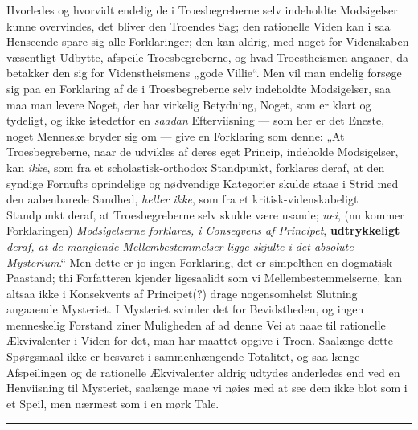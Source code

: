 \documentclass[12pt,a4paper]{book}
\newcommand{\opage}[1]{\marginnote{\footnotesize\textit{[#1]}}}
\begin{document}
Hvorledes og hvorvidt endelig de i Troesbegreberne
\opage{88}\setcounter{footnote}{0}%
selv indeholdte Modsigelser kunne overvindes, det bliver
den Troendes Sag; den rationelle Viden kan i saa
Henseende spare sig alle Forklaringer; den kan aldrig,
med noget for Videnskaben væsentligt Udbytte, afspeile
Troesbegreberne, og hvad Troestheismen angaaer, da
betakker den sig for Videnstheismens „gode Villie“. Men
vil man endelig forsøge sig paa en Forklaring af de i Troesbegreberne
selv indeholdte Modsigelser, saa maa man
levere Noget, der har virkelig Betydning, Noget, som
er klart og tydeligt, og ikke istedetfor en \emph{saadan} Efterviisning
--- som her er det Eneste, noget Menneske
bryder sig om --- give en Forklaring som denne:
„At Troesbegreberne, naar de udvikles af deres eget
Princip, indeholde Modsigelser, kan \emph{ikke}, som fra et
scholastisk-orthodox Standpunkt, forklares deraf, at den
syndige Fornufts oprindelige og nødvendige Kategorier
skulde staae i Strid med den aabenbarede Sandhed,
\emph{heller ikke}, som fra et kritisk-videnskabeligt Standpunkt
deraf, at Troesbegreberne selv skulde være usande; \emph{nei},
(nu kommer Forklaringen) \emph{Modsigelserne forklares,
i Conseqvens af Principet}, \textbf{udtrykkeligt} \emph{deraf,
at de manglende Mellembestemmelser ligge
skjulte i det absolute Mysterium}.“ Men dette
er jo ingen Forklaring, det er simpelthen en dogmatisk
Paastand; thi Forfatteren kjender ligesaalidt som vi
Mellembestemmelserne, kan altsaa ikke i Konsekvents af
Principet(?) drage nogensomhelst Slutning angaaende
Mysteriet. I Mysteriet svimler det for Bevidstheden,
og ingen menneskelig Forstand øiner Muligheden af ad
denne Vei at naae til rationelle Ækvivalenter i Viden
\opage{89}\setcounter{footnote}{0}%
for det, man har maattet opgive i Troen. Saalænge
dette Spørgsmaal ikke er besvaret i sammenhængende
Totalitet, og saa længe Afspeilingen og de rationelle
Ækvivalenter aldrig udtydes anderledes end ved en
Henviisning til Mysteriet, saalænge maae vi nøies med
at see dem ikke blot som i et Speil, men nærmest som
i en mørk Tale.

\begin{center}\rule{4em}{0.4pt}\end{center}
\end{document}

